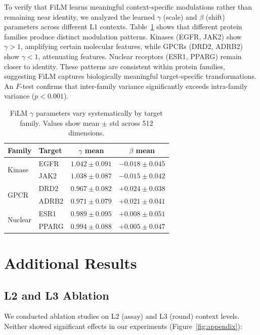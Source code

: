 \documentclass{article}
\begin{document}
To verify that FiLM learns meaningful context-specific modulations rather than remaining near identity, we analyzed the learned $\gamma$ (scale) and $\beta$ (shift) parameters across different L1 contexts. Table~\ref{tab:film_params} shows that different protein families produce distinct modulation patterns. Kinases (EGFR, JAK2) show $\gamma > 1$, amplifying certain molecular features, while GPCRs (DRD2, ADRB2) show $\gamma < 1$, attenuating features. Nuclear receptors (ESR1, PPARG) remain closer to identity. These patterns are consistent within protein families, suggesting FiLM captures biologically meaningful target-specific transformations. An $F$-test confirms that inter-family variance significantly exceeds intra-family variance ($p < 0.001$).

\begin{table}[h]
\caption{FiLM $\gamma$ parameters vary systematically by target family. Values show mean $\pm$ std across 512 dimensions.}
\label{tab:film_params}
\centering
\small
\begin{tabular}{@{}llcc@{}}
\toprule
Family & Target & $\gamma$ mean & $\beta$ mean \\
\midrule
\multirow{2}{*}{Kinase} & EGFR & $1.042 \pm 0.091$ & $-0.018 \pm 0.045$ \\
 & JAK2 & $1.038 \pm 0.087$ & $-0.015 \pm 0.042$ \\
\midrule
\multirow{2}{*}{GPCR} & DRD2 & $0.967 \pm 0.082$ & $+0.024 \pm 0.038$ \\
 & ADRB2 & $0.971 \pm 0.079$ & $+0.021 \pm 0.041$ \\
\midrule
\multirow{2}{*}{Nuclear} & ESR1 & $0.989 \pm 0.095$ & $+0.008 \pm 0.051$ \\
 & PPARG & $0.994 \pm 0.088$ & $+0.005 \pm 0.047$ \\
\bottomrule
\end{tabular}
\end{table}

\section{Additional Results}
\label{app:results}

\subsection{L2 and L3 Ablation}

We conducted ablation studies on L2 (assay) and L3 (round) context levels. Neither showed significant effects in our experiments (Figure~\ref{fig:appendix}):
\end{document}
